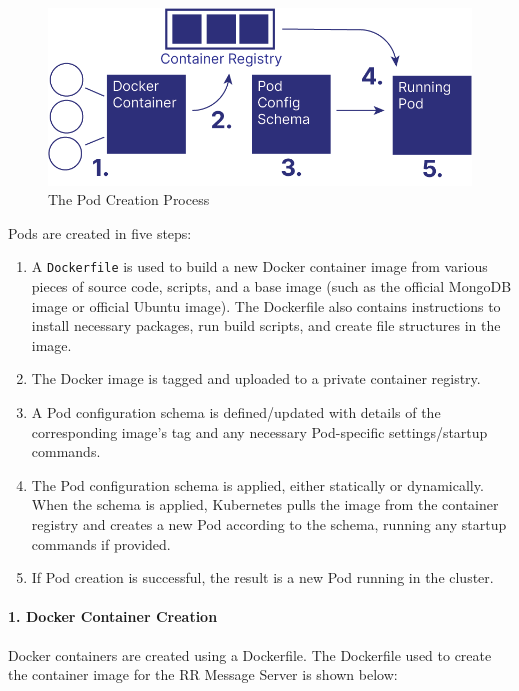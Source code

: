 \documentclass[12pt]{article}
\begin{document}
\begin{figure}[h!]

  \includegraphics[scale=.9]{pod_creation}
  \centering
  \caption{The Pod Creation Process}
  \label{podcreation:overview}
\end{figure}

Pods are created in five steps:

\begin{enumerate}
\item A \lstinline{Dockerfile} is used to build a new Docker container
  image from various pieces of source code, scripts, and a base image
  (such as the official MongoDB image or official Ubuntu image).  The
  Dockerfile also contains instructions to install necessary packages,
  run build scripts, and create file structures in the image.
\item The Docker image is tagged and uploaded to a private container
  registry.
\item A Pod configuration schema is defined/updated with details of
  the corresponding image's tag and any necessary Pod-specific
  settings/startup commands.
\item The Pod configuration schema is applied, either statically or
  dynamically.  When the schema is applied, Kubernetes pulls the image
  from the container registry and creates a new Pod according to the
  schema, running any startup commands if provided.
\item If Pod creation is successful, the result is a new Pod running
  in the cluster.
\end{enumerate}

\paragraph{1. Docker Container Creation}

Docker containers are created using a Dockerfile.  The Dockerfile used
to create the container image for the RR Message
Server is shown below:
\end{document}
